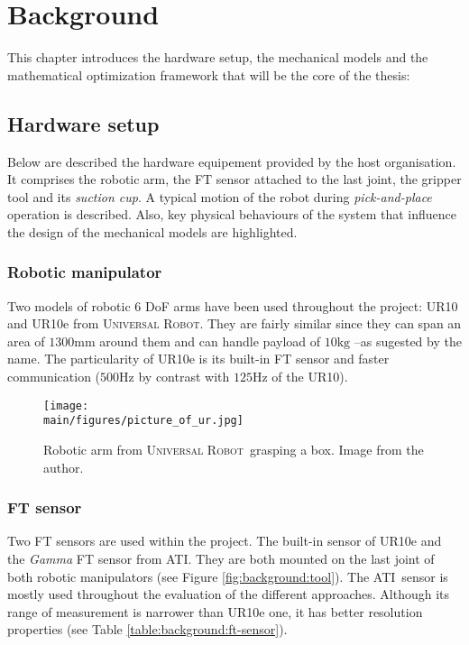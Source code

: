 \documentclass[/home/francois/latex/report/main.tex]{subfiles}
\begin{document}
\chapter{Background}
\label{chapter:background}

This chapter introduces the hardware setup, the mechanical models and the mathematical optimization framework that will be the core of the thesis:

\section{Hardware setup}
\label{section:hardware}

Below are described the hardware equipement provided by the host organisation. It comprises the robotic arm, the \ac{FT} sensor attached to the last joint, the gripper tool and its \textit{suction cup}. A typical motion of the robot during \textit{pick-and-place} operation is described. Also, key physical behaviours of the system that influence the design of the mechanical models are highlighted.

\subsection{Robotic manipulator}

Two models of robotic 6 \ac{DoF} arms have been used throughout the project: UR10 and UR10e from \textsc{Universal Robot}\texttrademark. They are fairly similar since they can span an area of $1300 \si{\milli\meter}$ around them and can handle payload of $10 \si{\kilo\gram}$ –as sugested by the name. The particularity of UR10e is its built-in \ac{FT} sensor and faster communication ($500 \si{\hertz}$ by contrast with $125 \si{\hertz}$ of the UR10).

\begin{figure}
  \centering
  \texttt{[image: \\main/figures/picture\_of\_ur.jpg]}
  \caption{Robotic arm from \textsc{Universal Robot}\texttrademark \ grasping a box. Image from the author.}
  \label{fig:background:albert}
\end{figure}

\subsection{\ac{FT} sensor}

Two \ac{FT} sensors are used within the project. The built-in sensor of UR10e and the \textit{Gamma} \ac{FT} sensor from ATI\texttrademark. They are both mounted on the last joint of both robotic manipulators (see Figure \ref{fig:background:tool}). The ATI\texttrademark \ sensor is mostly used throughout the evaluation of the different approaches. Although its range of measurement is narrower than UR10e one, it has better resolution properties (see Table \ref{table:background:ft-sensor}).
\end{document}

